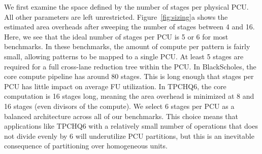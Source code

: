 We first examine the space defined by the number of stages per physical PCU.
All other parameters are left unrestricted.
Figure~\ref{fig:sizing}a shows the estimated area overheads after sweeping the number of stages between 4 and 16.
Here, we see that the ideal number of stages per PCU is 5 or 6 for most benchmarks.
In these benchmarks, the amount of compute per pattern is fairly small, allowing patterns to be mapped to a single PCU.
At least 5 stages are required for a full cross-lane reduction tree within the PCU.
In BlackScholes, the core compute pipeline has around 80 stages. This is long enough that stages per PCU has little impact on average FU utilization.
In TPCHQ6, the core computation is 16 stages long, meaning the area overhead is minimized at 8 and 16 stages (even divisors of the compute).
We select 6 stages per PCU as a balanced architecture across all of our benchmarks. 
This choice means that applications like TPCHQ6 with a relatively small number of operations that does not 
divide evenly by 6 will underutilize PCU partitions, but this is an inevitable consequence of partitioning over homogeneous units.

